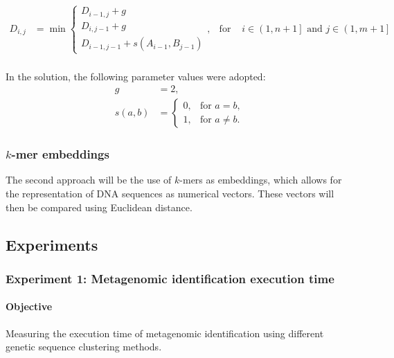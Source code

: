 \documentclass[pdflatex,sn-vancouver-num]{sn-jnl}%
\begin{document}
                \begin{equation}
                    \begin{aligned}
                        D_{i,j} &= \min
                        \begin{cases}
                        D_{i - 1, j} + g \\
                        D_{i, j - 1} + g \\
                        D_{i - 1, j - 1} + s(A_{i - 1}, B_{j - 1})
                        \end{cases}, & \text{for } & i \in \left(1, n + 1\right] \text{ and } j \in \left(1, m + 1\right] \\
                    \end{aligned}
                    \label{Equation:NeedlemanWunschModified}
                \end{equation}

                In the solution, the following parameter values were adopted:
                \begin{align*}
                    g &= 2, \\
                    s(a, b) &= \begin{cases}
                        0, & \text{for } a = b, \\
                        1, & \text{for } a \neq b.
                    \end{cases}
                \end{align*}

            \subsubsection{$k$-mer embeddings}
                The second approach will be the use of $k$-mers as embeddings, which allows for the representation of DNA sequences as numerical vectors. These vectors will then be compared using Euclidean distance.

        \subsection{Experiments}
            \subsubsection{Experiment 1: Metagenomic identification execution time}
                \paragraph{Objective} 
                Measuring the execution time of metagenomic identification using different genetic sequence clustering methods.
\end{document}
